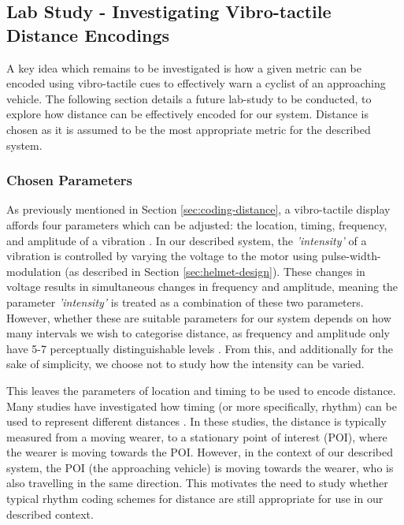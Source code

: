 \documentclass{interim}
\begin{document}
\subsection{Lab Study - Investigating Vibro-tactile Distance Encodings}\label{sec:lab-study}
A key idea which remains to be investigated is how a given metric can be encoded using vibro-tactile cues to effectively warn a cyclist of an approaching vehicle. The following section details a future lab-study to be conducted, to explore how distance can be effectively encoded for our system. Distance is chosen as it is assumed to be the most appropriate metric for the described system.

\subsubsection{Chosen Parameters}
As previously mentioned in Section \ref{sec:coding-distance}, a vibro-tactile display affords four parameters which can be adjusted: the location, timing, frequency, and amplitude of a vibration \cite{guidelines}. In our described system, the \textit{'intensity'} of a vibration is controlled by varying the voltage to the motor using pulse-width-modulation (as described in Section \ref{sec:helmet-design}). These changes in voltage results in simultaneous changes in frequency and amplitude, meaning the parameter \textit{'intensity'} is treated as a combination of these two parameters. However, whether these are suitable parameters for our system depends on how many intervals we wish to categorise distance, as frequency and amplitude only have 5-7 perceptually distinguishable levels \cite{guidelines}. From this, and additionally for the sake of simplicity, we choose not to study how the intensity can be varied. 

This leaves the parameters of location and timing to be used to encode distance. Many studies have investigated how timing (or more specifically, rhythm) can be used to represent different distances \cite{10.1145/1060581.1060585, 5326374, 10.1145/1520340.1520718, 10.1145/1753326.1753581, 10.1145/1868914.1868923}. In these studies, the distance is typically measured from a moving wearer, to a stationary point of interest (POI), where the wearer is moving towards the POI. However, in the context of our described system, the POI (the approaching vehicle) is moving towards the wearer, who is also travelling in the same direction. This motivates the need to study whether typical rhythm coding schemes for distance are still appropriate for use in our described context.
\end{document}
